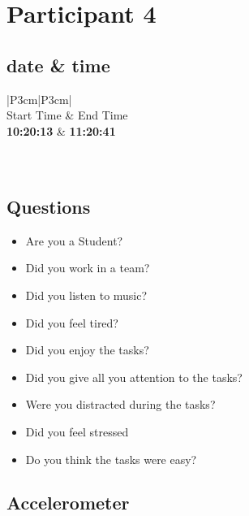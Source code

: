 \section{Participant 4}


\subsection{date \& time}
\begin{table}[ht]
  \begin{tabular}{|P{3cm}|P{3cm}|}
	    	\\ \hline
    Start Time      			& End Time   					\\ \hline
   \textbf{10:20:13} 	& \textbf{11:20:41}    	\\ \hline
       						\\ \hline
    			\\ \hline
  \end{tabular}
  \newline\newline
  \caption{p2: date and time}\label{dandt2}
\end{table}

\subsection{Questions}
\begin{itemize} 
  \item[\Checkmark] Are you a Student?
  \item[\XSolidBrush] Did you work in a team?
  \item[\XSolidBrush] Did you listen to music?
  \item[\Checkmark] Did you feel tired?
  \item[\Checkmark] Did you enjoy the tasks?
  \item[\XSolidBrush] Did you give all you attention to the tasks?
  \item[\Checkmark] Were you distracted during the tasks?
  \item[\Checkmark] Did you feel stressed
  \item[\XSolidBrush] Do you think the tasks were easy?  
\end{itemize}


\FloatBarrier
\newpage

\subsection{Accelerometer}

